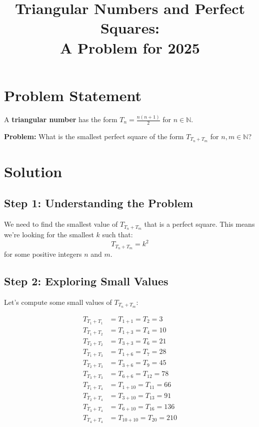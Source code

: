 \documentclass[12pt]{article}
\title{Triangular Numbers and Perfect Squares:\\A Problem for 2025}
\author{}
\date{}
\begin{document}
\maketitle

\section*{Problem Statement}

A \textbf{triangular number} has the form $T_n = \frac{n(n+1)}{2}$ for $n \in \mathbb{N}$.

\vspace{0.3cm}

\textbf{Problem:} What is the smallest perfect square of the form $T_{T_n + T_m}$ for $n, m \in \mathbb{N}$?

\vspace{1cm}

\section*{Solution}

\subsection*{Step 1: Understanding the Problem}

We need to find the smallest value of $T_{T_n + T_m}$ that is a perfect square. This means we're looking for the smallest $k$ such that:
\begin{equation}
T_{T_n + T_m} = k^2
\end{equation}
for some positive integers $n$ and $m$.

\subsection*{Step 2: Exploring Small Values}

Let's compute some small values of $T_{T_n + T_m}$:

\begin{align*}
T_{T_1 + T_1} &= T_{1 + 1} = T_2 = 3 \\
T_{T_1 + T_2} &= T_{1 + 3} = T_4 = 10 \\
T_{T_2 + T_2} &= T_{3 + 3} = T_6 = 21 \\
T_{T_1 + T_3} &= T_{1 + 6} = T_7 = 28 \\
T_{T_2 + T_3} &= T_{3 + 6} = T_9 = 45 \\
T_{T_3 + T_3} &= T_{6 + 6} = T_{12} = 78 \\
T_{T_1 + T_4} &= T_{1 + 10} = T_{11} = 66 \\
T_{T_2 + T_4} &= T_{3 + 10} = T_{13} = 91 \\
T_{T_3 + T_4} &= T_{6 + 10} = T_{16} = 136 \\
T_{T_4 + T_4} &= T_{10 + 10} = T_{20} = 210
\end{align*}
\end{document}
